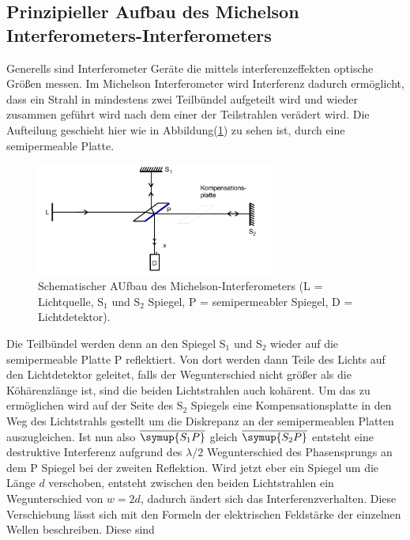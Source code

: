     \subsection{Prinzipieller Aufbau des Michelson Interferometers-Interferometers }

        \noindent Generells sind Interferometer Geräte die mittels interferenzeffekten optische Größen messen. Im Michelson Interferometer wird 
        Interferenz dadurch ermöglicht, dass ein Strahl in mindestens zwei Teilbündel aufgeteilt wird und wieder zusammen geführt wird nach  
        dem einer der Teilstrahlen verädert wird. Die Aufteilung geschieht hier wie in Abbildung(\ref{img:4}) zu sehen ist, 
        durch eine semipermeable Platte.

        \begin{figure}[ht]
            \centering
            \includegraphics[width=0.7\textwidth]{latex/images/PrinAuf.PNG}
            \caption{Schematischer AUfbau des Michelson-Interferometers (L = Lichtquelle, S$_1$ und S$_2$ Spiegel, P = semipermeabler Spiegel, 
            D = Lichtdetektor)\protect \cite{V401}.}
            \label{img:4}
        \end{figure}

        \noindent Die Teilbündel werden denn an den Spiegel S$_1$ und S$_2$ wieder auf die semipermeable Platte P reflektiert. Von dort werden dann 
        Teile des Lichts auf den Lichtdetektor geleitet, falls der Wegunterschied nicht größer als die Köhärenzlänge ist, sind die 
        beiden Lichtstrahlen auch kohärent. Um das zu ermöglichen wird auf der Seite des S$_2$ Spiegels eine Kompensationsplatte in den 
        Weg des Lichtstrahls gestellt um die Diskrepanz an der semipermeablen Platten auszugleichen. Ist nun also $\overline{\symup{S_1P}}$ 
        gleich $\overline{\symup{S_2P}}$ entsteht eine destruktive Interferenz aufgrund des $\lambda / 2$ Wegunterschied des Phasensprungs 
        an dem P Spiegel bei der zweiten Reflektion. Wird jetzt eber ein Spiegel um die Länge $d$ verschoben, entsteht zwischen den beiden 
        Lichtstrahlen ein Wegunterschied von $w = 2d$, dadurch ändert sich das Interferenzverhalten. Diese Verschiebung lässt sich mit den 
        Formeln der elektrischen Feldstärke der einzelnen Wellen beschreiben. Diese sind

